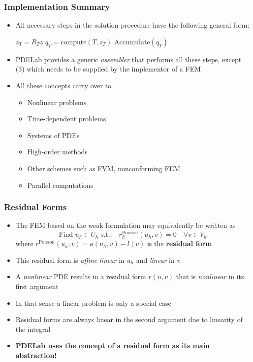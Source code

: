 \documentclass[aspectratio=169,11pt]{beamer}
\theoremstyle{definition}
\begin{document}
\begin{frame}
\frametitle{Implementation Summary}
\begin{itemize}
\item All necessary steps in the solution procedure have the following general form:
\begin{algorithmic}[1]
 
\State $z_T = R_T z$ 
\State $q_T=\text{compute}(T,z_T)$ 
\State $\text{Accumulate}(q_T)$ 
\EndFor
\end{algorithmic}
\item PDELab provides a generic {\em assembler} that performs all these steps,
except (3) which needs to be supplied by the implementor of a FEM
\item All these concepts carry over to
\begin{itemize}
\item Nonlinear problems
\item Time-dependent problems
\item Systems of PDEs
\item High-order methods
\item Other schemes such as FVM, nonconforming FEM
\item Parallel computations
\end{itemize}
\end{itemize}
\end{frame}

\begin{frame}
\frametitle{Residual Forms}
\begin{itemize}
\item The FEM based on the weak formulation may equivalently
be written as
\begin{equation*}
\text{Find $u_h\in U_h$ s.t.:} \quad r_h^\text{Poisson}(u_h,v)=0 \quad \forall v\in V_h.
\end{equation*}
where $r^\text{Poisson}(u_h,v) = a(u_h,v) - l(v)$ is the \textbf{residual form}
\item This residual form is {\em affine linear} in $u_h$ and {\em linear} in $v$
\item A {\em nonlinear} PDE results in a residual form $r(u,v)$ that is {\em nonlinear}
in its first argument
\item In that sense a linear problem is only a special case
\item Residual forms are always linear in the second argument due
to linearity of the integral
\item \textbf{PDELab uses the concept of a residual form as its main abstraction!}
\end{itemize}
\end{frame}
\end{document}
